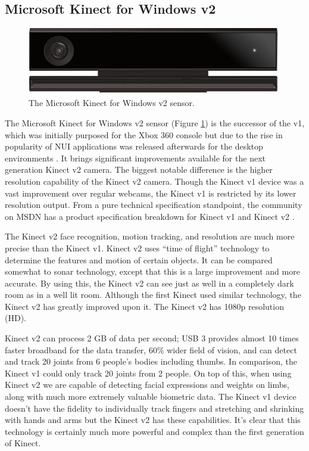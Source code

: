 \documentclass[a4paper, 12pt]{amsart}
\begin{document}
\subsection{Microsoft Kinect for Windows v2}

\begin{figure}[htb]
\centering
\includegraphics[width=.9\linewidth]{fig_microsoft_kinect_v2}
\caption{The Microsoft Kinect for Windows v2 sensor.}
\label{fig:microsoft_kinect_v2}
\end{figure}

The Microsoft Kinect for Windows v2 sensor (Figure \ref{fig:microsoft_kinect_v2}) is the successor of the v1, which was initially purposed for the Xbox 360 console but due to the rise in popularity of NUI applications was released afterwards for the desktop environments \cite{bib_microsoft_kinect_v2_sdk}. It brings significant improvements available for the next generation Kinect v2 camera. The biggest notable difference is the higher resolution capability of the Kinect v2 camera. Though the Kinect v1 device was a vast improvement over regular webcams, the Kinect v1 is restricted by its lower resolution output. From a pure technical specification standpoint, the community on MSDN has a product specification breakdown for Kinect v1 and Kinect v2 \cite{bib_msdn}.

The Kinect v2 face recognition, motion tracking, and resolution are much more precise than the Kinect v1. Kinect v2 uses ``time of flight'' technology to determine the features and motion of certain objects. It can be compared somewhat to sonar technology, except that this is a large improvement and more accurate. By using this, the Kinect v2 can see just as well in a completely dark room as in a well lit room. Although the first Kinect used similar technology, the Kinect v2 has greatly improved upon it. The Kinect v2 has 1080p resolution (HD).

Kinect v2 can process 2 GB of data per second; USB 3 provides almost 10 times faster broadband for the data transfer, 60\% wider field of vision, and can detect and track 20 joints from 6 people's bodies including thumbs. In comparison, the Kinect v1 could only track 20 joints from 2 people. On top of this, when using Kinect v2 we are capable of detecting facial expressions and weights on limbs, along with much more extremely valuable biometric data. The Kinect v1 device doesn't have the fidelity to individually track fingers and stretching and shrinking with hands and arms but the Kinect v2 has these capabilities. It's clear that this technology is certainly much more powerful and complex than the first generation of Kinect.
\end{document}
